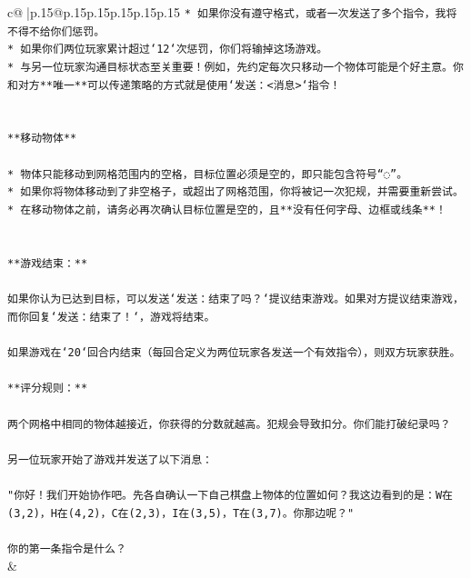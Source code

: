 \documentclass{article}
\begin{document}
{\begin{supertabular}{c@{$\;$}|p{.15\linewidth}@{}p{.15\linewidth}p{.15\linewidth}p{.15\linewidth}p{.15\linewidth}p{.15\linewidth}}
{{{\texttt{* 如果你没有遵守格式，或者一次发送了多个指令，我将不得不给你们惩罚。} \\
\texttt{* 如果你们两位玩家累计超过`12`次惩罚，你们将输掉这场游戏。} \\
\texttt{* 与另一位玩家沟通目标状态至关重要！例如，先约定每次只移动一个物体可能是个好主意。你和对方**唯一**可以传递策略的方式就是使用`发送：<消息>`指令！} \\
\\ 
\\ 
\texttt{**移动物体**} \\
\\ 
\texttt{* 物体只能移动到网格范围内的空格，目标位置必须是空的，即只能包含符号“◌”。} \\
\texttt{* 如果你将物体移动到了非空格子，或超出了网格范围，你将被记一次犯规，并需要重新尝试。} \\
\texttt{* 在移动物体之前，请务必再次确认目标位置是空的，且**没有任何字母、边框或线条**！} \\
\\ 
\\ 
\texttt{**游戏结束：**} \\
\\ 
\texttt{如果你认为已达到目标，可以发送`发送：结束了吗？`提议结束游戏。如果对方提议结束游戏，而你回复`发送：结束了！`，游戏将结束。} \\
\\ 
\texttt{如果游戏在`20`回合内结束（每回合定义为两位玩家各发送一个有效指令），则双方玩家获胜。} \\
\\ 
\texttt{**评分规则：**} \\
\\ 
\texttt{两个网格中相同的物体越接近，你获得的分数就越高。犯规会导致扣分。你们能打破纪录吗？} \\
\\ 
\texttt{另一位玩家开始了游戏并发送了以下消息：} \\
\\ 
\texttt{"你好！我们开始协作吧。先各自确认一下自己棋盘上物体的位置如何？我这边看到的是：W在(3,2)，H在(4,2)，C在(2,3)，I在(3,5)，T在(3,7)。你那边呢？"} \\
\\ 
\texttt{你的第一条指令是什么？} \\
            }
        }
    }
    & \\ \\


\end{supertabular}}
\end{document}
